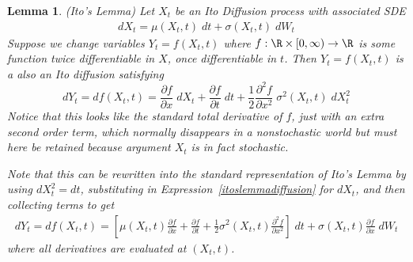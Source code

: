\documentclass[12pt]{article}
\theoremstyle{plain}
\newtheorem{lem}[thm]{Lemma}
\theoremstyle{definition}
\theoremstyle{remark}
\begin{document}
\begin{lem}\emph{(Ito's Lemma)}
Let $X_t$ be an Ito Diffusion process with associated SDE
\begin{align}
   dX_t = \mu(X_t,t)\; dt + \sigma(X_t,t)\; dW_t
   \label{itoslemmadiffusion}
\end{align}
Suppose we change variables $Y_t=f(X_t,t)$ where
$f: \R\times [0,\infty) \rightarrow \R$ is some function twice
differentiable in $X$, once differentiable in $t$.
Then $Y_t=f(X_t,t)$ is a also an Ito diffusion satisfying
\begin{equation}
   dY_t
   = df(X_t,t)
   =
   \frac{\partial f}{\partial x} \; dX_t
   + \frac{\partial f}{\partial t} \; dt
   + \frac{1}{2}
    \frac{\partial^2 f}{\partial x^2} \; \sigma^2(X_t,t) \; dX_t^2
\end{equation}
Notice that this looks like the standard total derivative of $f$, just
with an extra second order term, which normally disappears in a
nonstochastic world but must here be retained because argument $X_t$ is
in fact stochastic.

Note that this can be rewritten into the standard representation of
Ito's Lemma by using $dX_t^2=dt$, substituting in
Expression~\ref{itoslemmadiffusion} for $dX_t$, and then collecting
terms to get
\begin{align}
   \label{itoslemma}
   dY_t
   = df(X_t,t)
   =
   \left[
    \mu(X_t,t)\frac{\partial f}{\partial x}
   + \frac{\partial f}{\partial t}
   + \frac{1}{2}
     \sigma^2(X_t,t)\frac{\partial^2 f}{\partial x^2}
   \right]
   \; dt
    +
   \sigma(X_t,t)\frac{\partial f}{\partial x} \; dW_t
\end{align}
where all derivatives are evaluated at $(X_t,t)$.
\end{lem}
\end{document}

